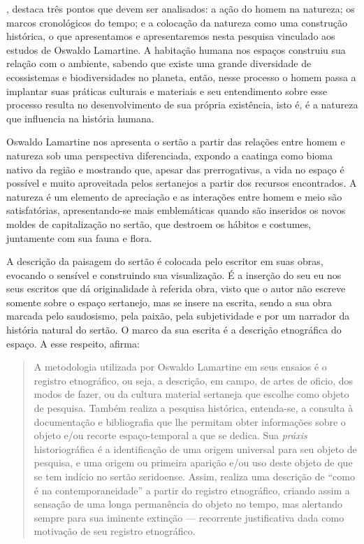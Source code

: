 \begin{refsection}
    \textcite[p.~83]{PÁDUA2010bases}, destaca três pontos que devem ser analisados: a ação do homem na natureza; os marcos cronológicos do tempo; e a colocação da natureza como uma construção histórica, o que apresentamos e apresentaremos nesta pesquisa vinculado aos estudos de Oswaldo Lamartine. A habitação humana nos espaços construiu sua relação com o ambiente, sabendo que existe uma grande diversidade de ecossistemas e biodiversidades no planeta, então, nesse processo o homem passa a implantar suas práticas culturais e materiais e seu entendimento sobre esse processo resulta no desenvolvimento de sua própria existência, isto é, é a natureza que influencia na história humana.  

    Oswaldo Lamartine nos apresenta o sertão a partir das relações entre homem e natureza sob uma perspectiva diferenciada, expondo a caatinga como bioma nativo da região e mostrando que, apesar das prerrogativas, a vida no espaço é possível e muito aproveitada pelos sertanejos a partir dos recursos encontrados. A natureza é um elemento de apreciação e as interações entre homem e meio são satisfatórias, apresentando-se mais emblemáticas quando são inseridos os novos moldes de capitalização no sertão, que destroem os hábitos e costumes, juntamente com sua fauna e flora. 

    A descrição da paisagem do sertão é colocada pelo escritor em suas obras, evocando o sensível e construindo sua visualização. É a inserção do seu eu nos seus escritos que dá originalidade à referida obra, visto que o autor não escreve somente sobre o espaço sertanejo, mas se insere na escrita, sendo a sua obra marcada pelo saudosismo, pela paixão, pela subjetividade e por um narrador da história natural do sertão. O marco da sua escrita é a descrição etnográfica do espaço. A esse respeito, \textcite[p.~32]{MEDEIROS2019Estilo} afirma: 

    \begin{quotation}
        A metodologia utilizada por Oswaldo Lamartine em seus ensaios é o registro etnográfico, ou seja, a descrição, em campo, de artes de oficio, dos modos de fazer, ou da cultura material sertaneja que escolhe como objeto de pesquisa. Também realiza a pesquisa histórica, entenda-se, a consulta à documentação e bibliografia que lhe permitam obter informações sobre o objeto e/ou recorte espaço-temporal a que se dedica. Sua \textit{práxis} historiográfica é a identificação de uma origem universal para seu objeto de pesquisa, e uma origem ou primeira aparição e/ou uso deste objeto de que se tem indício no sertão seridoense. Assim, realiza uma descrição de “como é na contemporaneidade” a partir do registro etnográfico, criando assim a sensação de uma longa permanência do objeto no tempo, mas alertando sempre para sua iminente extinção --- recorrente justificativa dada como motivação de seu registro etnográfico. 
    \end{quotation}


\end{refsection}
